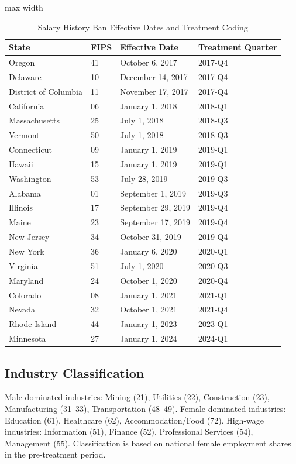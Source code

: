 \documentclass[12pt]{article}
\begin{document}
\begin{table}[H]
\centering
\caption{Salary History Ban Effective Dates and Treatment Coding}
\label{tab:app_treatment}
\begin{adjustbox}{max width=\textwidth}
\begin{tabular}{llll}
\toprule
State & FIPS & Effective Date & Treatment Quarter \\
\midrule
Oregon & 41 & October 6, 2017 & 2017-Q4 \\
Delaware & 10 & December 14, 2017 & 2017-Q4 \\
District of Columbia & 11 & November 17, 2017 & 2017-Q4 \\
California & 06 & January 1, 2018 & 2018-Q1 \\
Massachusetts & 25 & July 1, 2018 & 2018-Q3 \\
Vermont & 50 & July 1, 2018 & 2018-Q3 \\
Connecticut & 09 & January 1, 2019 & 2019-Q1 \\
Hawaii & 15 & January 1, 2019 & 2019-Q1 \\
Washington & 53 & July 28, 2019 & 2019-Q3 \\
Alabama & 01 & September 1, 2019 & 2019-Q3 \\
Illinois & 17 & September 29, 2019 & 2019-Q4 \\
Maine & 23 & September 17, 2019 & 2019-Q4 \\
New Jersey & 34 & October 31, 2019 & 2019-Q4 \\
New York & 36 & January 6, 2020 & 2020-Q1 \\
Virginia & 51 & July 1, 2020 & 2020-Q3 \\
Maryland & 24 & October 1, 2020 & 2020-Q4 \\
Colorado & 08 & January 1, 2021 & 2021-Q1 \\
Nevada & 32 & October 1, 2021 & 2021-Q4 \\
Rhode Island & 44 & January 1, 2023 & 2023-Q1 \\
Minnesota & 27 & January 1, 2024 & 2024-Q1 \\
\bottomrule
\end{tabular}
\end{adjustbox}
\end{table}

\subsection{Industry Classification}

Male-dominated industries: Mining (21), Utilities (22), Construction (23), Manufacturing (31--33), Transportation (48--49). Female-dominated industries: Education (61), Healthcare (62), Accommodation/Food (72). High-wage industries: Information (51), Finance (52), Professional Services (54), Management (55). Classification is based on national female employment shares in the pre-treatment period.
\end{document}
